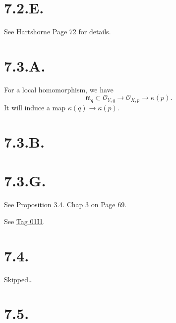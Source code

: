 \section{7.2.E.}

See Hartshorne \cite{hartshorne2013algebraic} Page 72 for details.

\section{7.3.A.}

For a local homomorphism, we have 
\[\mathfrak m_{q}\subset \mathscr O_{Y,q}\to \mathscr O_{X,p}\to\kappa (p).\]It will induce a map $\kappa(q)\to\kappa(p)$.

\section{7.3.B.}

\section{7.3.G.}

See \cite{gortz2020algebraic} Proposition 3.4. Chap 3 on Page 69.

See \href{https://stacks.math.columbia.edu/tag/01I1}{Tag 01I1}.

\section{7.4.}

Skipped\dots

\section{7.5.}

